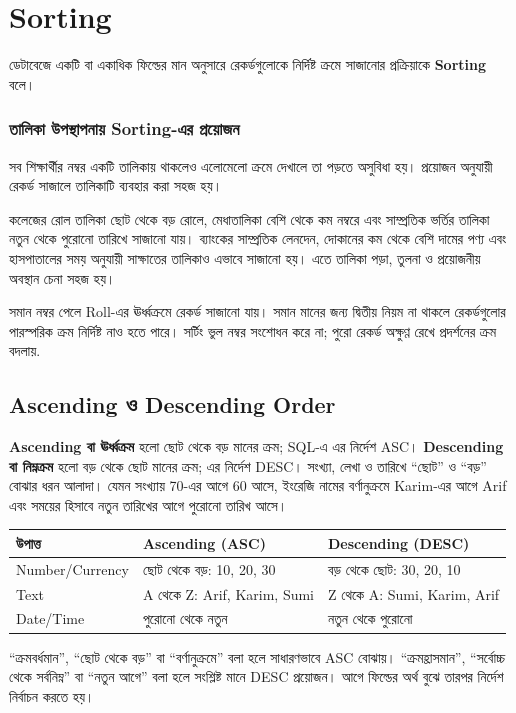 \section{Sorting}

\begin{definitionbox}{}
ডেটাবেজে একটি বা একাধিক ফিল্ডের মান অনুসারে রেকর্ডগুলোকে নির্দিষ্ট ক্রমে সাজানোর প্রক্রিয়াকে \textbf{Sorting} বলে।
\end{definitionbox}


\subsubsection{তালিকা উপস্থাপনায় Sorting-এর প্রয়োজন}
সব শিক্ষার্থীর নম্বর একটি তালিকায় থাকলেও এলোমেলো ক্রমে দেখালে তা পড়তে অসুবিধা হয়। প্রয়োজন অনুযায়ী রেকর্ড সাজালে তালিকাটি ব্যবহার করা সহজ হয়।




কলেজের রোল তালিকা ছোট থেকে বড় রোলে, মেধাতালিকা বেশি থেকে কম নম্বরে এবং সাম্প্রতিক ভর্তির তালিকা নতুন থেকে পুরোনো তারিখে সাজানো যায়। ব্যাংকের সাম্প্রতিক লেনদেন, দোকানের কম থেকে বেশি দামের পণ্য এবং হাসপাতালের সময় অনুযায়ী সাক্ষাতের তালিকাও এভাবে সাজানো হয়। এতে তালিকা পড়া, তুলনা ও প্রয়োজনীয় অবস্থান চেনা সহজ হয়।

সমান নম্বর পেলে Roll-এর ঊর্ধ্বক্রমে রেকর্ড সাজানো যায়। সমান মানের জন্য দ্বিতীয় নিয়ম না থাকলে রেকর্ডগুলোর পারস্পরিক ক্রম নির্দিষ্ট নাও হতে পারে। সর্টিং ভুল নম্বর সংশোধন করে না; পুরো রেকর্ড অক্ষুণ্ণ রেখে প্রদর্শনের ক্রম বদলায়.

\subsection{Ascending ও Descending Order}
\textbf{Ascending বা ঊর্ধ্বক্রম} হলো ছোট থেকে বড় মানের ক্রম; SQL-এ এর নির্দেশ ASC। \textbf{Descending বা নিম্নক্রম} হলো বড় থেকে ছোট মানের ক্রম; এর নির্দেশ DESC। সংখ্যা, লেখা ও তারিখে ``ছোট'' ও ``বড়'' বোঝার ধরন আলাদা। যেমন সংখ্যায় 70-এর আগে 60 আসে, ইংরেজি নামের বর্ণানুক্রমে Karim-এর আগে Arif এবং সময়ের হিসাবে নতুন তারিখের আগে পুরোনো তারিখ আসে।
\begin{flushleft}\begin{minipage}{\linewidth}\raggedright\small
\begin{tabularx}{\linewidth}{|p{25mm}|X|X|}\hline
উপাত্ত & Ascending (ASC) & Descending (DESC)\\\hline
Number/Currency & ছোট থেকে বড়: 10, 20, 30 & বড় থেকে ছোট: 30, 20, 10\\\hline
Text & A থেকে Z: Arif, Karim, Sumi & Z থেকে A: Sumi, Karim, Arif\\\hline
Date/Time & পুরোনো থেকে নতুন & নতুন থেকে পুরোনো\\\hline
\end{tabularx}
\end{minipage}\end{flushleft}
``ক্রমবর্ধমান'', ``ছোট থেকে বড়'' বা ``বর্ণানুক্রমে'' বলা হলে সাধারণভাবে ASC বোঝায়। ``ক্রমহ্রাসমান'', ``সর্বোচ্চ থেকে সর্বনিম্ন'' বা ``নতুন আগে'' বলা হলে সংশ্লিষ্ট মানে DESC প্রয়োজন। আগে ফিল্ডের অর্থ বুঝে তারপর নির্দেশ নির্বাচন করতে হয়।


